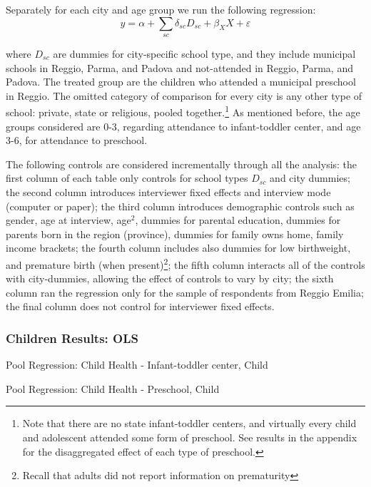 \begin{table}[H]
\begin{table}[H]
\begin{table}[H]
\begin{table}[H]
\begin{table}[H]
\begin{table}[H]
Separately for each city and age group we run the following regression:
\[ 
y = \alpha + \sum_{sc} \delta_{sc} D_{sc} + \beta_{X}X + \varepsilon
\]

where $D_{sc}$ are dummies for city-specific school type, and they include municipal schools in Reggio, Parma, and Padova and not-attended in Reggio, Parma, and Padova. The treated group are the children who attended a municipal preschool in Reggio. The omitted category of comparison for every city is any other type of school: private, state or religious, pooled together.\footnote{Note that there are no state infant-toddler centers, and virtually every child and adolescent attended some form of preschool. See results in the appendix for the disaggregated effect of each type of preschool.} As mentioned before, the age groups considered are 0-3, regarding attendance to infant-toddler center, and age 3-6, for attendance to preschool. 

The following controls are considered incrementally through all the analysis: the first column of each table only controls for school types $D_{sc}$ and city dummies; the second column introduces interviewer fixed effects and interview mode (computer or paper); the third column introduces demographic controls such as gender, age at interview, age$^2$, dummies for parental education, dummies for parents born in the region (province), dummies for family owns home, family income brackets; the fourth column includes also dummies for low birthweight, and premature birth (when present)\footnote{Recall that adults did not report information on prematurity}; the fifth column interacts all of the controls with city-dummies, allowing the effect of controls to vary by city; the sixth column ran the regression only for the sample of respondents from Reggio Emilia; the final column does not control for interviewer fixed effects.


\singlespacing
\setlength\tabcolsep{0.25em}
\subsubsection{Children Results: OLS}
\begin{small}
\begin{table}[H]
\caption{Pool Regression: Child Health - Infant-toddler center, Child}
  
\end{table}
\begin{table}[H]
\caption{Pool Regression: Child Health - Preschool, Child}

\end{table}


\end{small}
\end{table}
\end{table}
\end{table}
\end{table}
\end{table}
\end{table}
